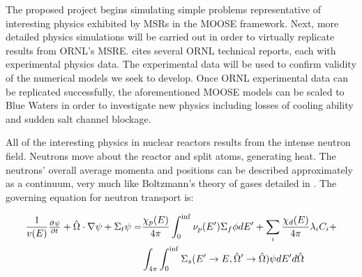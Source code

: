 \documentclass[12pt]{article}
\begin{document}
The proposed project begins simulating simple problems representative of interesting physics exhibited by MSRs in the MOOSE framework. Next, more detailed physics simulations will be carried out in order to virtually replicate results from ORNL's MSRE. \cite{robertson_msre} cites several ORNL technical reports, each with experimental physics data. The experimental data will be used to confirm validity of the numerical models we seek to develop. Once ORNL experimental data can be replicated successfully, the aforementioned MOOSE models can be scaled to Blue Waters in order to investigate new physics including losses of cooling ability and sudden salt channel blockage.

All of the interesting physics in nuclear reactors results from the intense neutron field. Neutrons move about the reactor and split atoms, generating heat. The neutrons' overall average momenta and positions can be described approximately as a continuum, very much like Boltzmann's theory of gases detailed in \cite{boltzmann_lectures_2011}. The governing equation for neutron transport is:

\begin{equation}
      \begin{aligned}
          \frac{1}{v(E)} \pd{\psi}{t} + \hat{\Omega}\cdot \nabla \psi + {\Sigma_t} \psi =&
          \frac{\chi_p(E)}{4 \pi} \int_{0}^{\inf} \nu_p(E') {\Sigma_f} {\phi} dE' + 
          \sum_i \frac{\chi_d(E)}{4 \pi} \lambda _i C_i + \\
          & \int_{4\pi}  \int_{0}^{\inf} {\Sigma_s(E'\rightarrow E,\hat{\Omega}'\rightarrow \hat{\Omega})} \psi dE' d\hat{\Omega}\\
      \end{aligned}
\label{eq:nte}
\end{equation}
\end{document}

